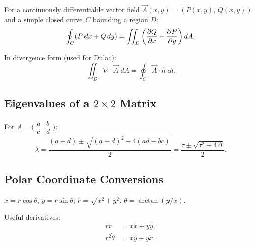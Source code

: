 \documentclass[11pt,letterpaper]{article}
\theoremstyle{definition}
\theoremstyle{plain}
\theoremstyle{remark}
\begin{document}
For a continuously differentiable vector field
$\vec{A}(x,y) = (P(x,y),\,Q(x,y))$ and a simple closed curve $C$ bounding
a region $D$:
\[
  \oint_C (P\,dx + Q\,dy) = \iint_D \left(\pdv{Q}{x} - \pdv{P}{y}\right)dA.
\]

In divergence form (used for Dulac):
\[
  \iint_D \nabla\cdot\vec{A}\;dA = \oint_C \vec{A}\cdot\hat{n}\;dl.
\]

\subsection{Eigenvalues of a $2\times 2$ Matrix}

For $A = \bigl(\begin{smallmatrix} a & b \\ c & d \end{smallmatrix}\bigr)$:
\[
  \lambda = \frac{(a+d) \pm \sqrt{(a+d)^2 - 4(ad-bc)}}{2}
  = \frac{\tau \pm \sqrt{\tau^2 - 4\Delta}}{2}.
\]

\subsection{Polar Coordinate Conversions}

$x = r\cos\theta$, $y = r\sin\theta$; \quad
$r = \sqrt{x^2+y^2}$, $\theta = \arctan(y/x)$.

Useful derivatives:
\begin{align}
  r\dot{r} &= x\dot{x} + y\dot{y}, \\
  r^2\dot{\theta} &= x\dot{y} - y\dot{x}.
\end{align}
\end{document}
